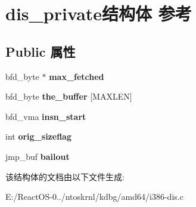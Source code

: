 \hypertarget{structdis__private}{}\section{dis\+\_\+private结构体 参考}
\label{structdis__private}
\subsection*{Public 属性}
\begin{DoxyCompactItemize}
\item 
\mbox{\label{structdis__private_a66f1ee79ea910a48d0b1c884900b8abb}} 
bfd\+\_\+byte $\ast$ {\bfseries max\+\_\+fetched}
\item 
\mbox{\label{structdis__private_a1078950d0437fde77c6cc9d2b0be62a9}} 
bfd\+\_\+byte {\bfseries the\+\_\+buffer} \mbox{[}M\+A\+X\+L\+EN\mbox{]}
\item 
\mbox{\label{structdis__private_ab3fc77adaa6952c6fc68e6a75ba9e681}} 
bfd\+\_\+vma {\bfseries insn\+\_\+start}
\item 
\mbox{\label{structdis__private_ad22da6bbb587798e97e3feca143b0773}} 
int {\bfseries orig\+\_\+sizeflag}
\item 
\mbox{\label{structdis__private_a9fddfe037a28dd44b57fdcf4bb085d46}} 
jmp\+\_\+buf {\bfseries bailout}
\end{DoxyCompactItemize}


该结构体的文档由以下文件生成\+:\begin{DoxyCompactItemize}
\item 
E\+:/\+React\+O\+S-\/0../ntoskrnl/kdbg/amd64/i386-\/dis.\+c\end{DoxyCompactItemize}
